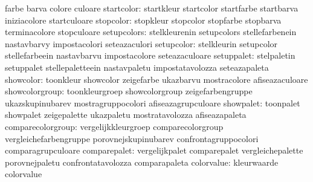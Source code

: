                                   farbe                            barva
                                  colore                           culoare
                     startcolor:  startkleur                       startcolor
                                  startfarbe                       startbarva
                                  iniziacolore                     startculoare
                      stopcolor:  stopkleur                        stopcolor
                                  stopfarbe                        stopbarva
                                  terminacolore                    stopculoare
                    setupcolors:  stelkleurenin                    setupcolors
                                  stellefarbenein                  nastavbarvy
                                  impostacolori                    seteazaculori
                     setupcolor:  stelkleurin                      setupcolor
                                  stellefarbeein                   nastavbarvu
                                  impostacolore                    seteazaculoare
                     setuppalet:  stelpaletin                      setuppalet
                                  stellepaletteein                 nastavpaletu
                                  impostatavolozza                 seteazapaleta
                      showcolor:  toonkleur                        showcolor
                                  zeigefarbe                       ukazbarvu
                                  mostracolore                     afiseazaculoare
                 showcolorgroup:  toonkleurgroep                   showcolorgroup
                                  zeigefarbengruppe                ukazskupinubarev
                                  mostragruppocolori               afiseazagrupculoare
                      showpalet:  toonpalet                        showpalet
                                  zeigepalette                     ukazpaletu
                                  mostratavolozza                  afiseazapaleta
              comparecolorgroup:  vergelijkkleurgroep              comparecolorgroup
                                  vergleichefarbengruppe           porovnejskupinubarev
                                  confrontagruppocolori            comparagrupculoare
                   comparepalet:  vergelijkpalet                   comparepalet
                                  vergleichepalette                porovnejpaletu
                                  confrontatavolozza               comparapaleta
                     colorvalue:  kleurwaarde                      colorvalue
